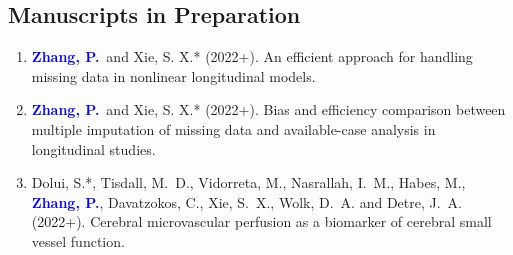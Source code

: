 \documentclass[12pt]{article}
\newcommand{\PZnot}{\textcolor{blue}{\textbf{Zhang, P.}}}
\begin{document}
	\subsection*{Manuscripts in Preparation}
	\begin{enumerate}
		\item \PZnot\ and {\sc Xie, S. X.*} (2022+). An efficient 
		approach for handling missing data in nonlinear longitudinal
		models.	
		
		\item \PZnot\ and {\sc Xie, S. X.*} (2022+). Bias 
		and efficiency comparison between multiple imputation of missing data and available-case analysis in longitudinal studies.
		
		\item {\sc Dolui, S.*, Tisdall, M.\ D., Vidorreta, M., Nasrallah, I.\ M., Habes, M.}, \PZnot, {\sc Davatzokos, C., Xie, S.\ X., Wolk, D.\ A.} and {\sc Detre, J.\ A.} 
		(2022+). Cerebral microvascular perfusion as a biomarker of 
		cerebral small vessel function.
	\end{enumerate}
	
\end{document}
